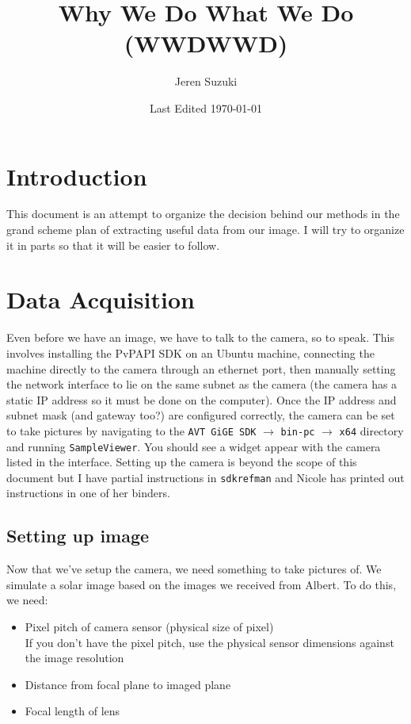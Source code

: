 \documentclass[10pt]{scrartcl}
\title{Why We Do What We Do (WWDWWD)}
\author{Jeren Suzuki}
\date{Last Edited \today}
\begin{document}
\maketitle
\tableofcontents
{}
\clearpage
{}

\section*{Introduction} %
\label{sec:introduction}
\indent This document is an attempt to organize the decision behind our methods in the grand scheme plan of extracting useful data from our image. I will try to organize it in parts so that it will be easier to follow.

\section{Data Acquisition} %
\label{sec:data_acquisition}
Even before we have an image, we have to talk to the camera, so to speak. This involves installing the PvPAPI SDK on an Ubuntu machine, connecting the machine directly to the camera through an ethernet port, then manually setting the network interface to lie on the same subnet as the camera (the camera has a static IP address so it must be done on the computer). Once the IP address and subnet mask (and gateway too?) are configured correctly, the camera can be set to take pictures by navigating to the \texttt{AVT GiGE SDK} $\rightarrow$ \texttt{bin-pc} $\rightarrow$ \texttt{x64} directory and running \texttt{SampleViewer}. You should see a widget appear with the camera listed in the interface. Setting up the camera is beyond the scope of this document but I have partial instructions in \texttt{sdkrefman} and Nicole has printed out instructions in one of her binders. 

\subsection{Setting up image} %
\label{sub:setting_up_image}

Now that we've setup the camera, we need something to take pictures of. We simulate a solar image based on the images we received from Albert. To do this, we need:

\begin{itemize}
    \item Pixel pitch of camera sensor (physical size of pixel)\\   
        If you don't have the pixel pitch, use the physical sensor dimensions against the image resolution
    \item Distance from focal plane to imaged plane
    \item Focal length of lens
\end{itemize}
\end{document}
